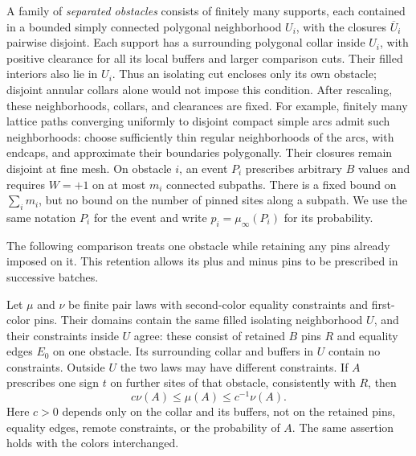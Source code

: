 A family of \emph{separated obstacles} consists of finitely many supports,
each contained in a bounded simply connected polygonal neighborhood $U_i$,
with the closures $\overline U_i$ pairwise disjoint.  Each support has a
surrounding polygonal collar inside $U_i$, with positive clearance for all
its local buffers and larger comparison cuts.  Their filled interiors
also lie in $U_i$.  Thus an isolating cut encloses only its own obstacle;
disjoint annular collars alone would not impose this condition.
After rescaling, these neighborhoods, collars, and clearances are fixed.
For example, finitely many lattice paths converging uniformly to disjoint
compact simple arcs admit such neighborhoods: choose sufficiently thin
regular neighborhoods of the arcs, with endcaps, and approximate their
boundaries polygonally.  Their closures remain disjoint at fine mesh.  On obstacle $i$, an event $P_i$ prescribes arbitrary
$B$ values and requires $W=+1$ on at most $m_i$ connected subpaths.  There
is a fixed bound on $\sum_i m_i$, but no bound on the number of pinned
sites along a subpath.  We use the same notation $P_i$ for the event and
write $p_i=\mu_\infty(P_i)$ for its probability.

The following comparison treats one obstacle while retaining any pins
already imposed on it.  This retention allows its plus and minus pins to
be prescribed in successive batches.

\begin{lemma}
\label{lem:relative-pin-comparison}
Let $\mu$ and $\nu$ be finite pair laws with second-color equality
constraints and first-color pins.  Their domains contain the same filled
isolating neighborhood $U$, and their constraints inside $U$ agree:
these consist of retained $B$ pins $R$ and equality edges $E_0$ on one
obstacle.  Its surrounding collar and buffers in $U$ contain no
constraints.  Outside $U$ the two laws may have different constraints.
If $A$ prescribes one sign $t$ on further sites of that obstacle,
consistently with $R$, then
\[
 c\nu(A)\leq\mu(A)\leq c^{-1}\nu(A).
\]
Here $c>0$ depends only on the collar and its buffers, not on the
retained pins, equality edges, remote constraints, or the probability
of $A$.  The same assertion holds with the colors interchanged.
\end{lemma}

